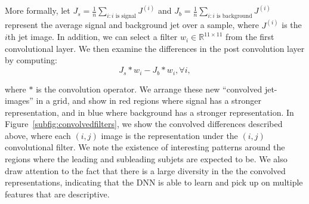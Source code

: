 More formally, let $J_s=\frac{1}{n}\sum_{i:i\text{ is signal}} J^{(i)}$ and $J_b=\frac{1}{n}\sum_{i:i\text{ is background}}J^{(i)}$ represent the average signal and background jet over a sample, where $J^{(i)}$ is the $i$th jet image. In addition, we can select a filter $w_i\in\mathbb{R}^{11\times11}$ from the first convolutional layer. We then examine the differences in the post convolution layer by computing:
\begin{equation}
  J_s \ast w_i - J_b \ast w_i, \forall i,
\end{equation}

\noindent where $\ast$ is the convolution operator. We arrange these new ``convolved jet-images'' in a grid, and show in red regions where signal has a stronger representation, and in blue where background has a stronger representation. In Figure~\ref{subfig:convolvedfilters}, we show the convolved differences described above, where each $(i, j)$ image is the representation under the $(i, j)$ convolutional filter. We note the existence of interesting patterns around the regions where the leading and subleading subjets are expected to be. We also draw attention to the fact that there is a large diversity in the the convolved representations, indicating that the DNN is able to learn and pick up on multiple features that are descriptive.
